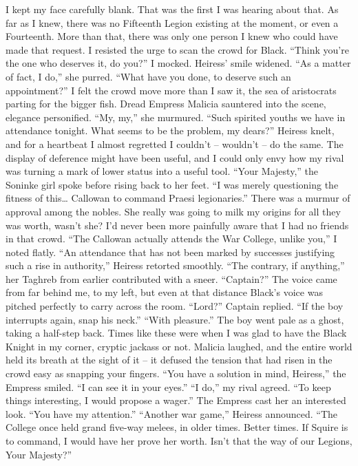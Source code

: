 \documentclass[12pt, openany]{book}
\begin{document}
I kept my face carefully blank. That was the first I was hearing about that. As far as I knew, there was no Fifteenth Legion existing at the moment, or even a Fourteenth. More than that, there was only one person I knew who could have made that request. I resisted the urge to scan the crowd for Black.
“Think you’re the one who deserves it, do you?” I mocked.
Heiress’ smile widened.
“As a matter of fact, I do,” she purred. “What have you done, to deserve such an appointment?”
I felt the crowd move more than I saw it, the sea of aristocrats parting for the bigger fish. Dread Empress Malicia sauntered into the scene, elegance personified.
“My, my,” she murmured. “Such spirited youths we have in attendance tonight. What seems to be the problem, my dears?”
Heiress knelt, and for a heartbeat I almost regretted I couldn’t – wouldn’t – do the same. The display of deference might have been useful, and I could only envy how my rival was turning a mark of lower status into a useful tool.
“Your Majesty,” the Soninke girl spoke before rising back to her feet. “I was merely questioning the fitness of this… Callowan to command Praesi legionaries.”
There was a murmur of approval among the nobles. She really was going to milk my origins for all they was worth, wasn’t she? I’d never been more painfully aware that I had no friends in that crowd.
“The Callowan actually attends the War College, unlike you,” I noted flatly.
“An attendance that has not been marked by successes justifying such a rise in authority,” Heiress retorted smoothly.
“The contrary, if anything,” her Taghreb from earlier contributed with a sneer.
“Captain?”
The voice came from far behind me, to my left, but even at that distance Black’s voice was pitched perfectly to carry across the room.
“Lord?” Captain replied.
“If the boy interrupts again, snap his neck.”
“With pleasure.”
The boy went pale as a ghost, taking a half-step back. Times like these were when I was glad to have the Black Knight in my corner, cryptic jackass or not. Malicia laughed, and the entire world held its breath at the sight of it – it defused the tension that had risen in the crowd easy as snapping your fingers.
“You have a solution in mind, Heiress,” the Empress smiled. “I can see it in your eyes.”
“I do,” my rival agreed. “To keep things interesting, I would propose a wager.”
The Empress cast her an interested look. “You have my attention.”
“Another war game,” Heiress announced. “The College once held grand five-way melees, in older times. Better times. If Squire is to command, I would have her prove her worth. Isn’t that the way of our Legions, Your Majesty?”
\end{document}
